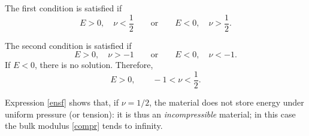 The first condition is satisfied if
\begin{equation}
	E>0, \quad \nu <\frac 12 \qquad \textrm{or} \qquad E<0, \quad \nu >\frac12.
\end{equation}

The second condition is satisfied if
\begin{equation}
	E>0, \quad \nu>-1 \qquad \textrm{or} \qquad E<0, \quad \nu <-1.
\end{equation}
If $E<0$, there is no solution. Therefore,
\begin{equation}
	E>0, \qquad -1<\nu< \frac12.
\end{equation}

\begin{remark}
	Expression \eqref{ensf} shows that, if $\nu=1/2$, the material does not store energy under uniform pressure (or tension): it is thus an \textit{incompressible} material; in this case the bulk modulus \eqref{compr} tends to infinity.
\end{remark}


